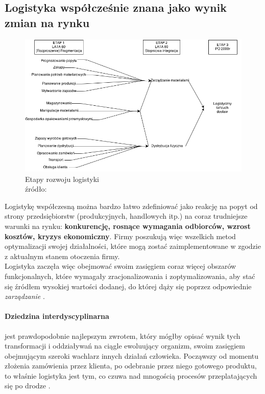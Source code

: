 	\subsection{Logistyka współcześnie znana jako wynik zmian na rynku}
		\begin{figure}[h]
			\centering
			\includegraphics[width=\textwidth]{images/etapy_rozwoju_logistyki}
			\caption[Etapy rozwoju logistyki]{
				Etapy rozwoju logistyki \\
				źródło: \cite{logityka_w_przedsiebiorstwie_sarsjusz_wolski_skowronek}
			}
		\end{figure}
		Logistykę współczesną można bardzo łatwo zdefiniować jako reakcję na popyt od
		strony przedsiębiorstw (produkcyjnych, handlowych itp.) na coraz trudniejsze warunki na
		rynku: \textbf{konkurencję, rosnące wymagania odbiorców, wzrost kosztów, kryzys ekonomi\-czny}.
		Firmy poszukują więc wszelkich metod optymalizacji swojej działalności, 
		które mogą zostać zaimplementowane w zgodzie z aktualnym stanem otoczenia firmy.\\
		
		Logistyka zaczęła więc obejmować swoim zasięgiem coraz więcej obszarów funkcjonalnych, które
		wymagały zracjonalizowania i zoptymalizowania, aby stać się źródłem wysokiej wartości dodanej, do której
		dąży się poprzez odpowiednie \emph{zarządzanie} \cite{logistyka_jako_dziedzina_wiedzy_cz1}.		
		
		\paragraph{Dziedzina interdyscyplinarna} jest prawdopodobnie najlepszym zwrotem, 
		który mógłby opisać wynik tych transformacji i oddziaływań na ciągle ewoluujący organizm, swoim
		zasięgiem obejmującym szeroki wachlarz innych działań człowieka. Począwszy od momentu złożenia
		zamówienia przez klienta, po odebranie przez niego gotowego produktu, to właśnie logistyka jest
		tym, co czuwa nad mnogością procesów przeplatających się po drodze \cite{logistyka_jako_dziedzina_wiedzy_cz2}.	
		
